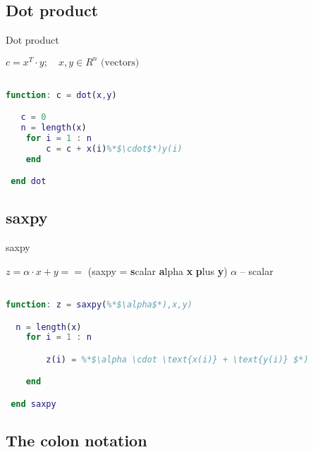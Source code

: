 \subsection{Dot product}

\begin{frame}[fragile]{Dot product}


$ c = x^T\cdot y; \quad x,y \in R^n\text{ (vectors)} $ %

\vspace{10px}
 \begin{lstlisting}[language=Matlab] %Trochę więcej się koloruje przy ustawieniu Matlab, ale jeśli wolisz, wróć do Pascala.

function: c = dot(x,y)

   c = 0
   n = length(x)
 	for i = 1 : n
 		c = c + x(i)%*$\cdot$*)y(i)
 	end

 end dot
 \end{lstlisting}


\end{frame}

\subsection{saxpy}

\begin{frame}[fragile]{saxpy}

$ z = \alpha \cdot x + y == $ (saxpy = \textbf{s}calar \textbf{a}lpha \textbf{x} \textbf{p}lus \textbf{y})  $\alpha$ -- scalar %
\vspace{10px}
 \begin{lstlisting}[language=Matlab]

function: z = saxpy(%*$\alpha$*),x,y)

  n = length(x)
 	for i = 1 : n

 		z(i) = %*$\alpha \cdot \text{x(i)} + \text{y(i)} $*)

 	end

 end saxpy
 \end{lstlisting}

\end{frame}


\subsection{The colon notation}

